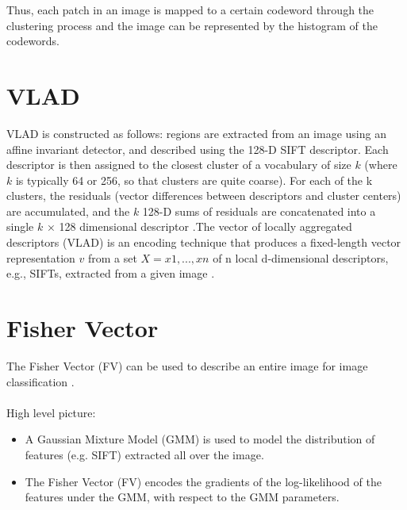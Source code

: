\documentclass[12pt]{article}
\numberwithin{equation}{section}
\numberwithin{table}{section}
\numberwithin{figure}{section}
\begin{document}
Thus, each patch in an image is mapped to a certain codeword through the clustering process and the image can be represented by the histogram of the codewords.









\section{VLAD} \label{vlad}

VLAD is constructed as follows: regions are extracted from an image using an affine invariant detector, and described using the 128-D SIFT descriptor. Each descriptor is then assigned to the closest cluster of a vocabulary of size $k$ (where $k$ is typically 64 or 256, so that clusters are quite coarse). For each of the k clusters, the residuals (vector differences between descriptors and cluster centers) are accumulated, and the $k$ 128-D sums of residuals are concatenated into a single $k$ × 128 dimensional descriptor \cite{Arandjelovic2013}.The vector of locally aggregated descriptors (VLAD) is an encoding technique that produces a fixed-length vector representation $v$ from a set $X = {x1, . . . , xn}$ of n local d-dimensional descriptors, e.g., SIFTs, extracted from a given image \cite{Delhumeau2013}.

\section{Fisher Vector} \label{fv}



The Fisher Vector (FV) can be used to describe an entire image for image classification \cite{Sanchez2013}. \\\\High level picture:

\begin{itemize}
	\item A Gaussian Mixture Model (GMM) is used to model the distribution of features (e.g. SIFT) extracted all over the image.
	\item The Fisher Vector (FV) encodes the gradients of the log-likelihood of the features under the GMM, with respect to the GMM parameters.
\end{itemize}
\end{document}
